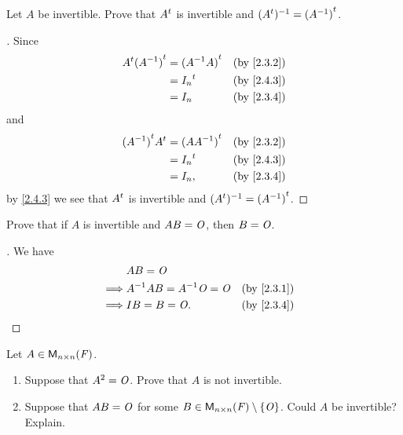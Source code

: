\begin{ex}\label{ex:2.4.5}
	Let \(A\) be invertible.
	Prove that \({A}^{t}\) is invertible and \(({A}^{t})^{-1} = {(A^{-1})}^{t}\).
\end{ex}

\begin{proof}[]
	Since
	\begin{align*}
		\tp{A} \tp{(A^{-1})} & = \tp{(A^{-1} A)} &  & \by{2.3.2} \\
		                     & = \tp{I_n}        &  & \by{2.4.3} \\
		                     & = I_n             &  & \by{2.3.4}
	\end{align*}
	and
	\begin{align*}
		\tp{(A^{-1})} \tp{A} & = \tp{(A A^{-1})} &  & \by{2.3.2} \\
		                     & = \tp{I_n}        &  & \by{2.4.3} \\
		                     & = I_n,            &  & \by{2.3.4}
	\end{align*}
	by \cref{2.4.3} we see that \({A}^{t}\) is invertible and \(({A}^{t})^{-1} = {(A^{-1})}^{t}\).
\end{proof}

\begin{ex}\label{ex:2.4.6}
	Prove that if \(A\) is invertible and \(AB = \mathit{O}\), then \(B = \mathit{O}\).
\end{ex}

\begin{proof}[]
	We have
	\begin{align*}
		         & AB = \zm                                     \\
		\implies & A^{-1} AB = A^{-1} \zm = \zm &  & \by{2.3.1} \\
		\implies & IB = B = \zm.                &  & \by{2.3.4}
	\end{align*}
\end{proof}

\begin{ex}\label{ex:2.4.7}
	Let \(A \in \ms[n][n][\F]\).
	\begin{enumerate}
		\item Suppose that \(A^2 = \mathit{O}\).
		      Prove that \(A\) is not invertible.
		\item Suppose that \(AB = \mathit{O}\) for some \(B \in \ms[n][n][\F] \setminus \set{\zm}\).
		      Could \(A\) be invertible?
		      Explain.
	\end{enumerate}
\end{ex}

